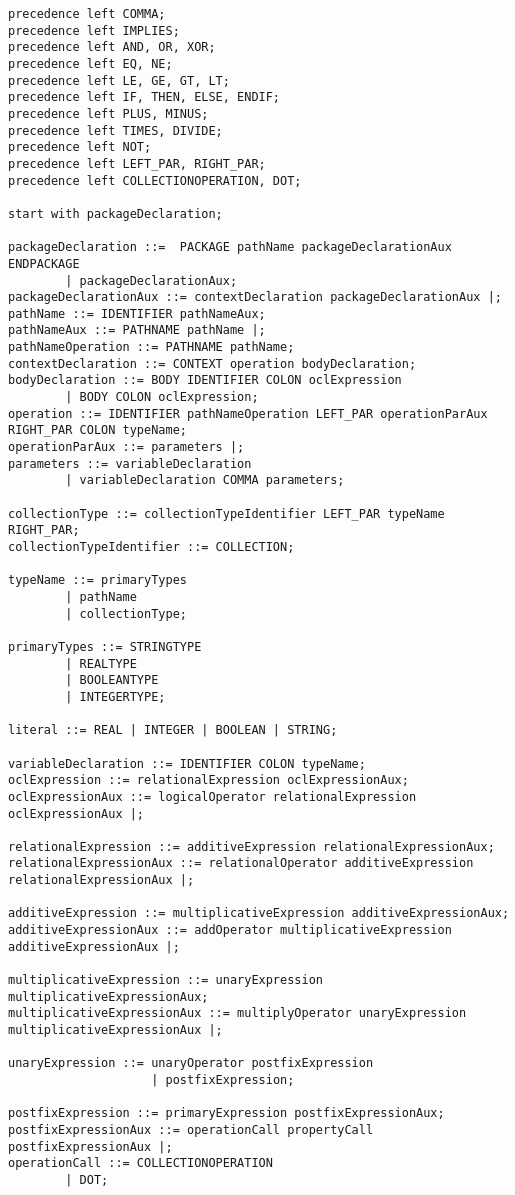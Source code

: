 \begin{lstlisting}[frame=single, caption={AnaliseSintatica.cup}]
precedence left COMMA;
precedence left IMPLIES;
precedence left AND, OR, XOR;
precedence left EQ, NE;
precedence left LE, GE, GT, LT; 
precedence left IF, THEN, ELSE, ENDIF;
precedence left PLUS, MINUS;
precedence left TIMES, DIVIDE;
precedence left NOT;
precedence left LEFT_PAR, RIGHT_PAR;
precedence left COLLECTIONOPERATION, DOT; 

start with packageDeclaration;

packageDeclaration ::=  PACKAGE pathName packageDeclarationAux ENDPACKAGE
		| packageDeclarationAux;
packageDeclarationAux ::= contextDeclaration packageDeclarationAux |;
pathName ::= IDENTIFIER pathNameAux;
pathNameAux ::= PATHNAME pathName |;
pathNameOperation ::= PATHNAME pathName;
contextDeclaration ::= CONTEXT operation bodyDeclaration;
bodyDeclaration ::= BODY IDENTIFIER COLON oclExpression
		| BODY COLON oclExpression;
operation ::= IDENTIFIER pathNameOperation LEFT_PAR operationParAux RIGHT_PAR COLON typeName;
operationParAux ::= parameters |;
parameters ::= variableDeclaration
		| variableDeclaration COMMA parameters;

collectionType ::= collectionTypeIdentifier LEFT_PAR typeName RIGHT_PAR;
collectionTypeIdentifier ::= COLLECTION;
			 
typeName ::= primaryTypes 
		| pathName
		| collectionType;

primaryTypes ::= STRINGTYPE
		| REALTYPE
		| BOOLEANTYPE
		| INTEGERTYPE;
			
literal ::= REAL | INTEGER | BOOLEAN | STRING;
			
variableDeclaration ::= IDENTIFIER COLON typeName;
oclExpression ::= relationalExpression oclExpressionAux;
oclExpressionAux ::= logicalOperator relationalExpression oclExpressionAux |;

relationalExpression ::= additiveExpression relationalExpressionAux;
relationalExpressionAux ::= relationalOperator additiveExpression relationalExpressionAux |;

additiveExpression ::= multiplicativeExpression additiveExpressionAux;
additiveExpressionAux ::= addOperator multiplicativeExpression additiveExpressionAux |;

multiplicativeExpression ::= unaryExpression multiplicativeExpressionAux;
multiplicativeExpressionAux ::= multiplyOperator unaryExpression multiplicativeExpressionAux |;

unaryExpression ::= unaryOperator postfixExpression
					| postfixExpression;

postfixExpression ::= primaryExpression postfixExpressionAux;
postfixExpressionAux ::= operationCall propertyCall postfixExpressionAux |;
operationCall ::= COLLECTIONOPERATION 
		| DOT;
				  

\end{lstlisting}

